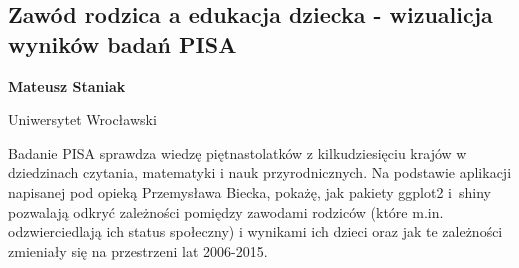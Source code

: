 \documentclass[\main/boa.tex]{subfiles}
\begin{document}
\subsection{Zawód rodzica a edukacja dziecka - wizualicja wyników badań PISA}

\begin{minipage}{0.915\textwidth}
	\centering
  {\bf {} Mateusz Staniak}
\end{minipage}



\begin{affiliations}
\begin{minipage}{0.915\textwidth}
\centering
Uniwersytet Wrocławski \\[-2pt]
\end{minipage}
\end{affiliations}

\vskip 0.3cm

 Badanie PISA sprawdza wiedzę piętnastolatków z kilkudziesięciu krajów w dziedzinach czytania, matematyki i nauk przyrodnicznych. Na podstawie aplikacji napisanej pod opieką Przemysława Biecka, pokażę, jak pakiety ggplot2 i~shiny pozwalają odkryć zależności pomiędzy zawodami rodziców (które m.in. odzwierciedlają ich status społeczny) i wynikami ich dzieci oraz jak te zależności zmieniały się na przestrzeni lat 2006-2015.
\end{document}
